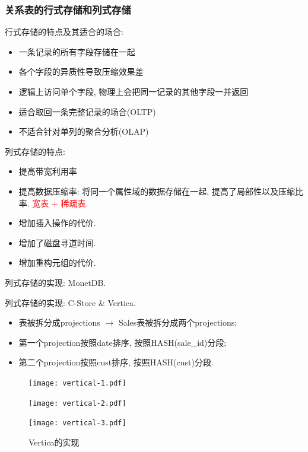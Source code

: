 \subsubsection{关系表的行式存储和列式存储}

行式存储的特点及其适合的场合:
\begin{itemize}
    \item 一条记录的所有字段存储在一起
    \item 各个字段的异质性导致压缩效果差
    \item 逻辑上访问单个字段, 物理上会把同一记录的其他字段一并返回
    \item 适合取回一条完整记录的场合(OLTP)
    \item 不适合针对单列的聚合分析(OLAP)
\end{itemize}

列式存储的特点:
\begin{itemize}
    \item 提高带宽利用率
    \item 提高数据压缩率: 将同一个属性域的数据存储在一起, 提高了局部性以及压缩比率. \textcolor{red}{宽表 + 稀疏表}.
    \item 增加插入操作的代价.
    \item 增加了磁盘寻道时间.
    \item 增加重构元组的代价.
\end{itemize}

列式存储的实现: MonetDB.

列式存储的实现: C-Store\cite{stonebrakerCstoreColumnorientedDBMS2018} \& Vertica\cite{lambVerticaAnalyticDatabase2012}.
\begin{itemize}
    \item 表被拆分成projections $\to$ Sales表被拆分成两个projections;
    \item 第一个projection按照date排序, 按照HASH(sale\_id)分段;
    \item 第二个projection按照cust排序, 按照HASH(cust)分段.
\end{itemize}

\begin{figure}[H]
  \centering
  \begin{minipage}[t]{0.32\textwidth}
    \centering
    \texttt{[image: vertical-1.pdf]}
  \end{minipage}
  \begin{minipage}[t]{0.34\textwidth}
    \centering
    \texttt{[image: vertical-2.pdf]}
  \end{minipage}
  \begin{minipage}[t]{0.3\textwidth}
    \centering
    \texttt{[image: vertical-3.pdf]}
  \end{minipage}
  \caption{Vertica的实现}
  \label{fig:three-side-by-side}
\end{figure}


